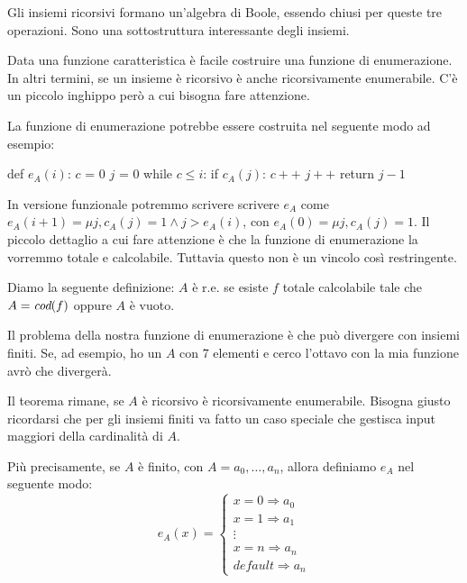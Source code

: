 Gli insiemi ricorsivi formano un'algebra di Boole, essendo chiusi per queste tre operazioni. Sono
una sottostruttura interessante degli insiemi.

Data una funzione caratteristica è facile costruire una funzione di enumerazione. In altri termini,
se un insieme è ricorsivo è anche ricorsivamente enumerabile. C'è un piccolo inghippo però a cui
bisogna fare attenzione.

La funzione di enumerazione potrebbe essere costruita nel seguente modo ad esempio:
\begin{python}
    def $e_{A}(i)$:
        $c$ = 0
        $j$ = 0
        while $c \leq i$:
            if $c_{A}(j)$:
                $c++$
            $j++$
        return $j-1$
\end{python}

In versione funzionale potremmo scrivere scrivere $e_{A}$ come $e_{A}(i+1) = \mu j, c_{A}(j) = 1
\land j > e_{A}(i)$, con $e_{A}(0) = \mu j, c_{A}(j) = 1$. Il piccolo dettaglio a cui fare
attenzione è che la funzione di enumerazione la vorremmo totale e calcolabile. Tuttavia questo non è
un vincolo così restringente.

Diamo la seguente definizione: $A$ è r.e. se esiste $f$ totale calcolabile tale che $A = \textit{cod}(f)$
oppure $A$ è vuoto.

Il problema della nostra funzione di enumerazione è che può divergere con insiemi finiti. Se, ad
esempio, ho un $A$ con 7 elementi e cerco l'ottavo con la mia funzione avrò che divergerà.

Il teorema rimane, se $A$ è ricorsivo è ricorsivamente enumerabile. Bisogna giusto ricordarsi che
per gli insiemi finiti va fatto un caso speciale che gestisca input maggiori della cardinalità di
$A$.

Più precisamente, se $A$ è finito, con $A = {a_{0},\dotsc,a_{n}}$, allora definiamo $e_{A}$ nel
seguente modo:
\begin{equation*}
    e_{A}(x) = 
        \begin{cases}
                x = 0 \Rightarrow a_{0} \\
                x = 1 \Rightarrow a_{1} \\
                \vdots \\
                x = n \Rightarrow a_{n} \\
                \textit{default} \Rightarrow a_{n}
        \end{cases}
\end{equation*}

